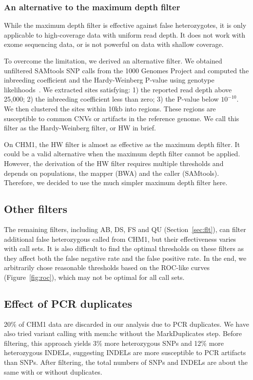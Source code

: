 \documentclass{bioinfo}
\begin{document}
\subsubsection{An alternative to the maximum depth filter}
While the maximum depth filter is effective against false heterozygotes, it is
only applicable to high-coverage data with uniform read depth. It
does not work with exome sequencing data, or is not powerful on data with
shallow coverage.

To overcome the limitation, we derived an alternative filter. We obtained
unfiltered SAMtools SNP calls from the 1000 Genomes Project and computed the
inbreeding coefficient and the Hardy-Weinberg P-value using genotype
likelihoods~\citep{Li:2011ab}. We extracted sites satisfying: 1) the reported
read depth above 25,000; 2) the inbreeding coefficient less than zero; 3) the
P-value below $10^{-10}$. We then clustered the sites within 10kb into regions.
These regions are susceptible to common CNVs or artifacts in the reference
genome. We call this filter as the Hardy-Weinberg filter, or HW in brief.

On CHM1, the HW filter is almost as effective as the maximum depth filter.
It could be a valid alternative when the maximum depth filter cannot be
applied.  However, the derivation of the HW filter requires multiple
thresholds and depends on populations, the mapper (BWA) and the caller
(SAMtools). Therefore, we decided to use the much simpler maximum depth filter
here.

\subsection{Other filters}
The remaining filters, including AB, DS, FS and QU (Section~\ref{sec:flt}), can
filter additional false heterozygous called from CHM1, but their effectiveness
varies with call sets. It is also difficult to find the optimal thresholds on
these filters as they affect both the false negative rate and the false
positive rate. In the end, we arbitrarily chose reasonable thresholds based on
the ROC-like curves (Figure~\ref{fig:roc}), which may not be optimal for all
call sets.

\subsection{Effect of PCR duplicates}
20\% of CHM1 data are discarded in our analysis due to PCR duplicates. We have
also tried variant calling with mem:hc without the MarkDuplicates step. Before
filtering, this approach yields 3\% more heterozygous SNPs and 12\% more
heterozygous INDELs, suggesting INDELs are more susceptible to PCR artifacts
than SNPs. After filtering, the total numbers of SNPs and INDELs are about the
same with or without duplicates.
\end{document}
